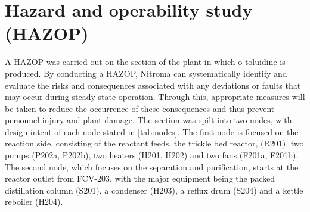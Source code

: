 \section{Hazard and operability study (HAZOP) }
 
A HAZOP was carried out on the section of the plant in which o-toluidine is produced. By conducting a HAZOP, Nitroma can systematically identify and evaluate the risks and consequences associated with any deviations or faults that may occur during steady state operation. Through this, appropriate measures will be taken to reduce the occurrence of these consequences and thus prevent personnel injury and plant damage. The section was spilt into two nodes, with design intent of each node stated in \cref{tab:nodes}. The first node is focused on the reaction side, consisting of the reactant feeds, the trickle bed reactor, (R201), two pumps (P202a, P202b), two heaters (H201, H202) and two fans (F201a, F201b). The second node, which focuses on the separation and purification, starts at the reactor outlet from FCV-203, with the major equipment being the packed distillation column (S201), a condenser (H203), a reflux drum (S204) and a kettle reboiler (H204). 


 

